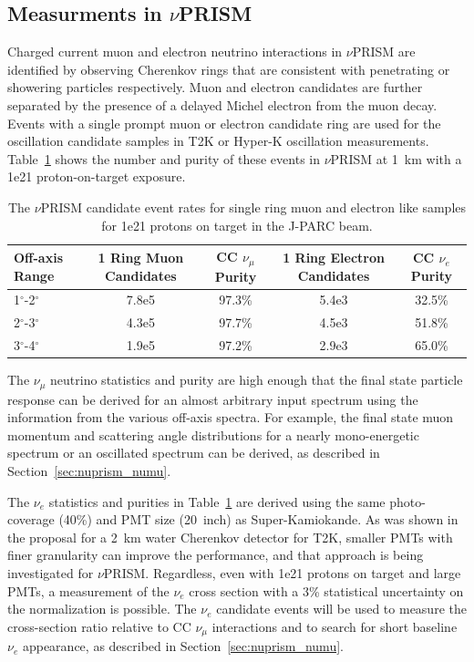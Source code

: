 \subsection{Measurments in $\nu$PRISM}
Charged current muon and electron neutrino interactions in $\nu$PRISM are identified by observing Cherenkov rings that
are consistent with penetrating or showering particles respectively.  Muon and electron candidates are further separated by the
presence of a delayed Michel electron from the muon decay.  Events with a single prompt muon or electron candidate ring are 
used for the oscillation candidate samples in T2K or Hyper-K oscillation measurements.  Table~\ref{tab:events} shows the number
and purity of these events in $\nu$PRISM at 1~km with a 1e21 proton-on-target exposure.

\begin{table}[tbh]
\caption{The $\nu$PRISM candidate event rates for single ring muon and electron like samples for 1e21 protons on target in
the J-PARC beam.}
\label{tab:events}
\begin{tabular}{l|cc|cc}
\hline
Off-axis Range & 1 Ring Muon Candidates & CC $\nu_{\mu}$ Purity & 1 Ring Electron Candidates & CC $\nu_{e}$ Purity \\
\hline
1$^{\circ}$-2$^{\circ}$ & 7.8e5 & 97.3\% & 5.4e3 & 32.5\%\\
2$^{\circ}$-3$^{\circ}$ & 4.3e5 & 97.7\% & 4.5e3 & 51.8\% \\
3$^{\circ}$-4$^{\circ}$ & 1.9e5 & 97.2\% & 2.9e3 & 65.0\% \\
\hline
\end{tabular}
\end{table}

The $\nu_{\mu}$ neutrino statistics and purity are high enough that the final state particle response can be derived for 
an almost arbitrary input spectrum using the information from the various off-axis spectra.  For example, the final state
muon momentum and scattering angle distributions for a nearly mono-energetic spectrum or an oscillated spectrum can 
be derived, as described in Section~\ref{sec:nuprism_numu}.

The $\nu_{e}$ statistics and purities in Table~\ref{tab:events} are derived using the same photo-coverage (40\%) and 
PMT size (20~inch) as Super-Kamiokande.  As was shown in the proposal for a 2~km water Cherenkov detector for T2K, smaller
PMTs with finer granularity can improve the performance, and that approach is being investigated for $\nu$PRISM. 
Regardless,
even with 1e21 protons on target and large PMTs, a measurement of the $\nu_{e}$ cross section with a 3\% statistical uncertainty
on the normalization is possible.  The $\nu_{e}$ candidate events will be used to measure the cross-section ratio relative to 
CC $\nu_{\mu}$ interactions and to search for short baseline $\nu_e$ appearance, as described in Section~\ref{sec:nuprism_numu}.

